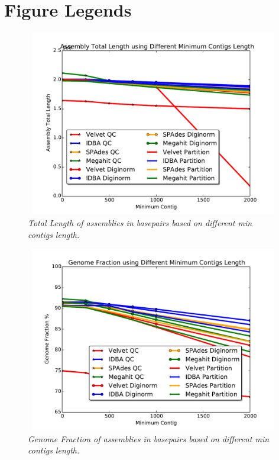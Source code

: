 \section*{Figure Legends}
%
\begin{figure} [h] 
 
\begin{center}  
 

\includegraphics[height=3.2in,width=4.5in]{total-length-contigs.pdf}  
\caption{\small \sl Total Length of assemblies in basepairs based on different min contigs length.\label{fig:mincontig}}  
\end{center}  
\end{figure}  
 

\begin{figure} [h] 
\begin{center}  
 
\includegraphics[height=3.2in,width=4.5in]{genome-fraction-contigs.pdf}  
\caption{\small \sl Genome Fraction of assemblies in basepairs based on different min contigs length.\label{fig:gf}}  
\end{center}  
\end{figure}  



